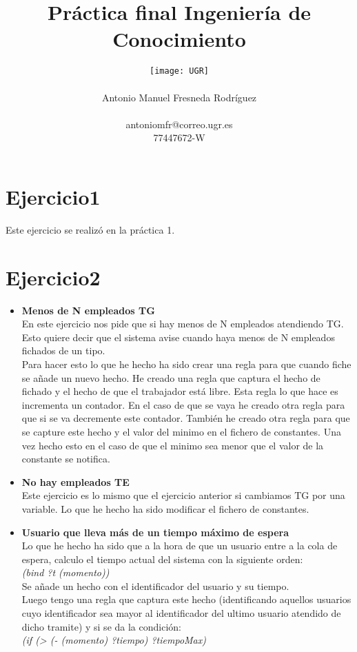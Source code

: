\documentclass[10pt,spanish]{article}
\author{
	\texttt{[image: UGR]} \\\\
	\Large 	Antonio Manuel Fresneda Rodríguez\\
	\\antoniomfr@correo.ugr.es
	\\77447672-W
	}
\date{}
\title{\huge \textbf{Práctica final Ingeniería de Conocimiento}}
\begin{document}
	\maketitle
	\pagebreak
	\tableofcontents
	\pagebreak
	\section{Ejercicio1}
	Este ejercicio se realizó en la práctica 1.
	\section{Ejercicio2}
	\begin{itemize}
		\item \textbf{Menos de N empleados TG}\\
		En este ejercicio nos pide que si hay menos de N empleados atendiendo TG. Esto quiere decir que el sistema avise cuando haya menos de N empleados fichados de un tipo. \\
		Para hacer esto lo que he hecho ha sido crear una regla para que cuando fiche se añade un nuevo hecho. He creado una regla que captura el hecho de fichado y el hecho de que el
		trabajador está libre. Esta regla lo que hace es incrementa un contador. En el caso de que se vaya he creado otra regla para que si se va decremente este contador. También he creado
		otra regla para que se capture este hecho y el valor del minimo en el fichero de constantes. Una vez hecho esto en el caso de que el minimo sea menor que el valor de la constante
		se notifica.
		\item \textbf{No hay empleados TE}\\
		Este ejercicio es lo mismo que el ejercicio anterior si cambiamos TG por una variable. Lo que he hecho ha sido modificar el fichero de constantes.
		\item \textbf{Usuario que lleva más de un tiempo 	máximo de espera}\\ Lo que he hecho ha sido que a la hora de que un usuario entre a la cola de espera, calculo el tiempo actual del sistema con la siguiente orden:\\ \textit{(bind ?t (momento))
		}\\
		Se añade un hecho con el identificador del usuario y su tiempo. \\Luego tengo una regla que captura este hecho  (identificando aquellos usuarios cuyo identificador sea mayor al identificador del ultimo usuario atendido de dicho tramite) y si se da la condición:\\ \textit{(if (> (- (momento) ?tiempo) ?tiempoMax)}\\

\end{itemize}
\end{document}
